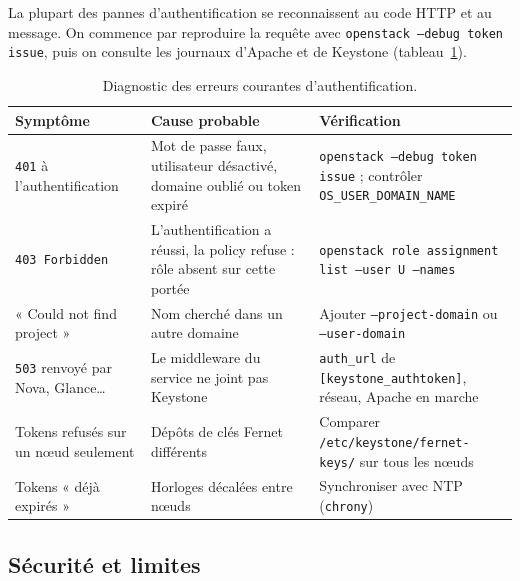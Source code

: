 La plupart des pannes d'authentification se reconnaissent au code HTTP et au message. On commence par reproduire la requête avec
\texttt{openstack --debug token issue}, puis on consulte les journaux d'Apache et de Keystone (tableau~\ref{tab:ks-pannes}).

\begin{table}[!ht]
\centering
\renewcommand{\arraystretch}{1.2}
\begin{tabular}{@{}>{\raggedright\arraybackslash}p{4.0cm}>{\raggedright\arraybackslash}p{5.6cm}>{\raggedright\arraybackslash}p{5.9cm}@{}}
\toprule
\textbf{Symptôme} & \textbf{Cause probable} & \textbf{Vérification}\\
\midrule
\texttt{401} à l'authentification & Mot de passe faux, utilisateur désactivé, domaine
  oublié ou token expiré & \texttt{openstack --debug token issue} ; contrôler \texttt{OS\_USER\_DOMAIN\_NAME} \\
\texttt{403 Forbidden} & L'authentification a réussi, la
  policy refuse : rôle absent sur cette portée & \texttt{openstack role assignment list --user U --names} \\
« Could not find project » & Nom cherché dans un autre domaine & Ajouter
  \texttt{--project-domain} ou \texttt{--user-domain} \\
\texttt{503} renvoyé par Nova, Glance\dots{} & Le middleware du service ne joint pas Keystone &
  \texttt{auth\_url} de \texttt{[keystone\_authtoken]}, réseau, Apache en marche \\
Tokens refusés sur un nœud seulement & Dépôts de clés Fernet différents &
  Comparer \texttt{/etc/keystone/fernet-keys/} sur tous les nœuds \\
Tokens « déjà expirés » & Horloges décalées entre nœuds & Synchroniser avec NTP (\texttt{chrony}) \\
\bottomrule
\end{tabular}
\caption{Diagnostic des erreurs courantes d'authentification.}
\label{tab:ks-pannes}
\end{table}

\subsection{Sécurité et limites}\label{sec:ks-securite}

